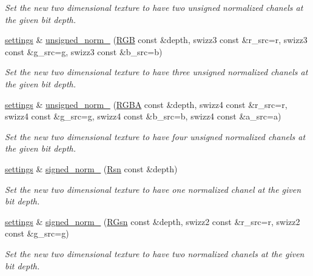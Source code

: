 \begin{DoxyCompactItemize}
\begin{DoxyCompactList}\small\item\em Set the new two dimensional texture to have two unsigned normalized chanels at the given bit depth. \end{DoxyCompactList}\item 
\hyperlink{classgfx_1_1texture__2D_1_1settings}{settings} \& \hyperlink{classgfx_1_1texture__2D_1_1settings_aa3cf375126e3b3802244e6555d0f119e}{unsigned\-\_\-norm\-\_} (\hyperlink{classgfx_1_1RGB}{R\-G\-B} const \&depth, swizz3 const \&r\-\_\-src=r, swizz3 const \&g\-\_\-src=g, swizz3 const \&b\-\_\-src=b)
\begin{DoxyCompactList}\small\item\em Set the new two dimensional texture to have three unsigned normalized chanels at the given bit depth. \end{DoxyCompactList}\item 
\hyperlink{classgfx_1_1texture__2D_1_1settings}{settings} \& \hyperlink{classgfx_1_1texture__2D_1_1settings_aacd9d528c27ab0fa153b935970ddab8d}{unsigned\-\_\-norm\-\_} (\hyperlink{classgfx_1_1RGBA}{R\-G\-B\-A} const \&depth, swizz4 const \&r\-\_\-src=r, swizz4 const \&g\-\_\-src=g, swizz4 const \&b\-\_\-src=b, swizz4 const \&a\-\_\-src=a)
\begin{DoxyCompactList}\small\item\em Set the new two dimensional texture to have four unsigned normalized chanels at the given bit depth. \end{DoxyCompactList}\item 
\hyperlink{classgfx_1_1texture__2D_1_1settings}{settings} \& \hyperlink{classgfx_1_1texture__2D_1_1settings_a76bceeb350645ef684f24ae223b249d9}{signed\-\_\-norm\-\_} (\hyperlink{classgfx_1_1Rsn}{Rsn} const \&depth)
\begin{DoxyCompactList}\small\item\em Set the new two dimensional texture to have one normalized chanel at the given bit depth. \end{DoxyCompactList}\item 
\hyperlink{classgfx_1_1texture__2D_1_1settings}{settings} \& \hyperlink{classgfx_1_1texture__2D_1_1settings_a177942ae5aec69544a61155535f08d79}{signed\-\_\-norm\-\_} (\hyperlink{classgfx_1_1RGsn}{R\-Gsn} const \&depth, swizz2 const \&r\-\_\-src=r, swizz2 const \&g\-\_\-src=g)
\begin{DoxyCompactList}\small\item\em Set the new two dimensional texture to have two normalized chanels at the given bit depth. \end{DoxyCompactList}\item 

\end{DoxyCompactItemize}
